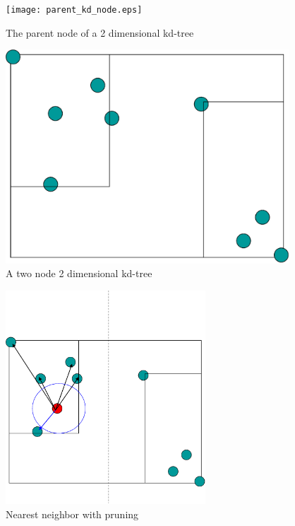\documentclass[12pt,letterpaper,doublespaced,ETD,dvips,proposal]{gtthesis}
\begin{document}
\begin{Body}
\begin{figure}[!htb]
\label{parent_kd_node}
\centerline{\texttt{[image: parent\_kd\_node.eps]}}
\caption{The parent node of a 2
dimensional kd-tree}
\end{figure}


\begin{figure}[!htb]
\label{2_kd_node}
\centerline{\includegraphics[height=8cm]{2_kd_node.eps}}
\caption{A two node 2 dimensional
kd-tree}
\end{figure}


\begin{figure}[!htb]
\label{nearest_neighbor_searchon_kd}
\centerline{\includegraphics[height=8cm]{nearest_neighbor_searchon_kd.eps}}
\caption{Nearest neighbor with pruning}
\end{figure}


\end{Body}
\end{document}
